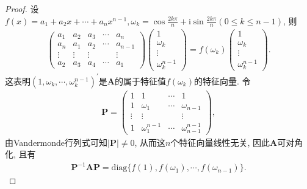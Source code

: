 \documentclass[../../main.tex]{subfiles}%
\begin{document}
\begin{proof}

设\(f(x)=a_{1}+a_{2}x+\cdots+a_{n}x^{n - 1},\omega_{k}=\cos\frac{2k\pi}{n}+\mathrm{i}\sin\frac{2k\pi}{n}(0\leqslant  k\leqslant  n - 1)\), 则
\begin{align*}
\begin{pmatrix}
a_{1}&a_{2}&a_{3}&\cdots&a_{n}\\
a_{n}&a_{1}&a_{2}&\cdots&a_{n - 1}\\
\vdots&\vdots&\vdots&&\vdots\\
a_{2}&a_{3}&a_{4}&\cdots&a_{1}
\end{pmatrix}\begin{pmatrix}
1\\
\omega_{k}\\
\vdots\\
\omega_{k}^{n - 1}
\end{pmatrix}=f(\omega_{k})\begin{pmatrix}
1\\
\omega_{k}\\
\vdots\\
\omega_{k}^{n - 1}
\end{pmatrix}.
\end{align*}
这表明\((1,\omega_{k},\cdots,\omega_{k}^{n - 1})^{\prime}\)是\(\boldsymbol{A}\)的属于特征值\(f(\omega_{k})\)的特征向量. 令
\begin{align*}
\boldsymbol{P}=\begin{pmatrix}
1&1&\cdots&1\\
1&\omega_{1}&\cdots&\omega_{n - 1}\\
\vdots&\vdots&&\vdots\\
1&\omega_{1}^{n - 1}&\cdots&\omega_{n - 1}^{n - 1}
\end{pmatrix},
\end{align*}
由Vandermonde行列式可知\(\vert\boldsymbol{P}\vert\neq 0\), 从而这\(n\)个特征向量线性无关, 因此\(\boldsymbol{A}\)可对角化, 且有
\begin{align*}
\boldsymbol{P}^{-1}\boldsymbol{AP}=\mathrm{diag}\{f(1),f(\omega_{1}),\cdots,f(\omega_{n - 1})\}.
\end{align*} 

\end{proof}
\end{document}
